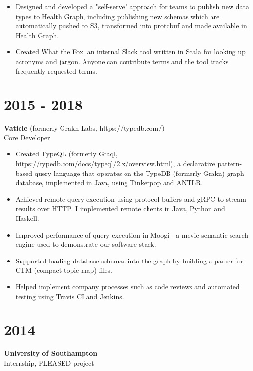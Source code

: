 \documentclass[margin]{res}
\begin{document}
\begin{resume}
\begin{itemize}
\item
Designed and developed a "self-serve" approach for teams to publish new data types to Health Graph, including publishing new schemas which are automatically pushed to S3, transformed into protobuf and made available in Health Graph.

\item
Created What the Fox, an internal Slack tool written in Scala for looking up acronyms and jargon. Anyone can contribute terms and the tool tracks frequently requested terms.

\end{itemize}

\normalsize{\section{2015 - 2018}}
{\bf Vaticle} (formerly Grakn Labs, \href{https://typedb.com/}{https://typedb.com/}) \\
Core Developer
\begin{itemize}

\item
Created TypeQL (formerly Graql, \href{https://typedb.com/docs/typeql/2.x/overview.html}{https://typedb.com/docs/typeql/2.x/overview.html}), a declarative pattern-based query language that operates on the TypeDB (formerly Grakn) graph database, implemented in Java, using Tinkerpop and ANTLR.

\item
Achieved remote query execution using protocol buffers and gRPC to stream results over HTTP. I implemented remote clients in Java, Python and Haskell.

\item
Improved performance of query execution in Moogi - a movie semantic search engine used to demonstrate our software stack.

\item
Supported loading database schemas into the graph by building a parser for CTM (compact topic map) files.

\item
Helped implement company processes such as code reviews and automated testing using Travis CI and Jenkins.

\end{itemize}

\normalsize{\section{2014}}
{\bf University of Southampton} \\
Internship, PLEASED project


\end{resume}
\end{document}
